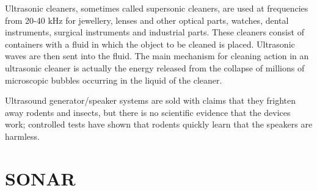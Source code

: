 Ultrasonic cleaners, sometimes called supersonic cleaners, are used at frequencies from 20-40 kHz for jewellery, lenses and other optical parts, watches, dental instruments, surgical instruments and industrial parts.
These cleaners consist of containers with a fluid in which the object to be cleaned is placed. Ultrasonic waves are then sent into the fluid. The main mechanism for cleaning action in an ultrasonic cleaner is actually the energy released from the collapse of millions of microscopic bubbles occurring in the liquid of the cleaner.

\begin{IFact}{Ultrasound generator/speaker systems are sold with claims that they frighten away rodents and insects, but there is no scientific evidence that the devices work; controlled tests have shown that rodents quickly learn that the speakers are harmless.
}\end{IFact}




\section{SONAR}

